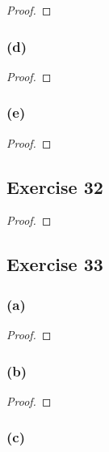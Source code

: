 \documentclass[14pt]{extarticle}
\begin{document}
\begin{proof}

\end{proof}

\subsubsection{(d)}

\begin{proof}

\end{proof}

\subsubsection{(e)}

\begin{proof}

\end{proof}

\subsection{Exercise 32}

\begin{proof}

\end{proof}

\subsection{Exercise 33}

\subsubsection{(a)}

\begin{proof}

\end{proof}

\subsubsection{(b)}

\begin{proof}

\end{proof}

\subsubsection{(c)}
\end{document}
